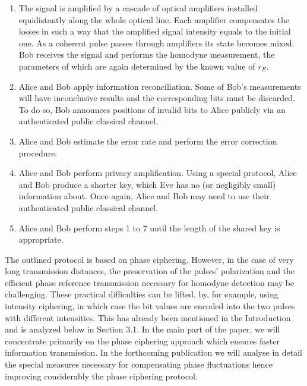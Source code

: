 \documentclass[a4paper]{article}
\begin{document}
\begin{enumerate}
    \item The signal is amplified by a cascade of optical amplifiers installed equidistantly along the whole optical line. 
    Each amplifier compensates the losses in such a way that the amplified signal intensity equals to the initial one.
    As a coherent pulse passes through amplifiers its state becomes mixed.
    Bob receives the signal and performs the homodyne measurement, the parameters of which are again determined by the known value of $r_E$.

    \item Alice and Bob apply information reconciliation.
    Some of Bob's measurements will have inconclusive results and the corresponding bits must be discarded.
    To do so, Bob announces positions of invalid bits to Alice publicly via an authenticated public classical channel.
    
    \item Alice and Bob estimate the error rate and perform the error correction procedure.
    
    \item Alice and Bob perform privacy amplification.
    Using a special protocol, Alice and Bob produce a shorter key, which Eve has no (or negligibly small) information about.
    Once again, Alice and Bob may need to use their authenticated public classical channel.
    
    \item Alice and Bob perform steps 1 to 7 until the length of the shared key is appropriate.
\end{enumerate}

The outlined protocol is based on phase ciphering.
However, in the case of very long transmission distances, the preservation of the pulses' polarization and the efficient phase reference transmission necessary for homodyne detection may be challenging.
These practical difficulties can be lifted, by, for example, using intensity ciphering, in which case the bit values are encoded into the two pulses with different intensities.
This has already been mentioned in the Introduction and is analyzed below in Section 3.1.
%
In the main part of the paper, we will concentrate primarily on the phase ciphering approach which ensures faster information transmission. In the forthcoming publication we will analyse in detail the special measures necessary for compensating phase fluctuations hence improving considerably   the phase ciphering protocol.
\end{document}
